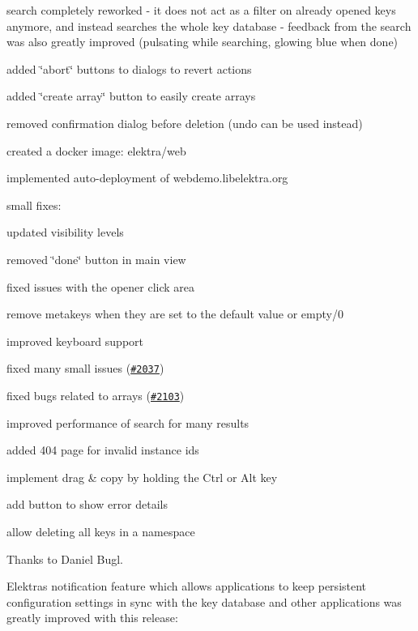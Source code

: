 \begin{DoxyItemize}
\item search completely reworked -\/ it does not act as a filter on already opened keys anymore, and instead searches the whole key database -\/ feedback from the search was also greatly improved (pulsating while searching, glowing blue when done)
\item added \char`\"{}abort\char`\"{} buttons to dialogs to revert actions
\item added \char`\"{}create array\char`\"{} button to easily create arrays
\item removed confirmation dialog before deletion (undo can be used instead)
\item created a docker image\+: {\ttfamily elektra/web}
\item implemented auto-\/deployment of webdemo.\+libelektra.\+org
\item small fixes\+:
\begin{DoxyItemize}
\item updated visibility levels
\item removed \char`\"{}done\char`\"{} button in main view
\item fixed issues with the opener click area
\item remove metakeys when they are set to the default value or empty/0
\item improved keyboard support
\item fixed many small issues (\href{https://issues.libelektra.org/2037}{\tt \#2037})
\end{DoxyItemize}
\end{DoxyItemize}


\begin{DoxyItemize}
\item fixed bugs related to arrays (\href{https://issues.libelektra.org/2103}{\tt \#2103})
\item improved performance of search for many results
\item added 404 page for invalid instance ids
\item implement drag \& copy by holding the Ctrl or Alt key
\item add button to show error details
\item allow deleting all keys in a namespace
\end{DoxyItemize}

Thanks to Daniel Bugl.

Elektra\textquotesingle{}s notification feature which allows applications to keep persistent configuration settings in sync with the key database and other applications was greatly improved with this release\+:


